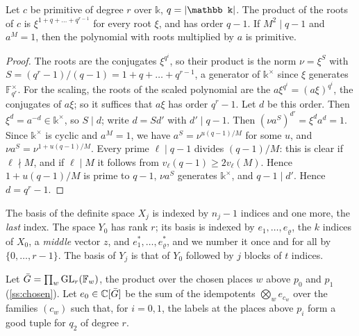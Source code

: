 \begin{lemma}\label{lem:primitive-label}
Let $c$ be primitive of degree $r$ over $\mathbb k$, $q=\abs{\mathbb k}$. The product of the roots of $c$ is
$\xi^{1+q+\dots+q^{r-1}}$ for every root $\xi$, and has order $q-1$. If $M^2\mid q-1$ and $a^M=1$, then the
polynomial with roots multiplied by $a$ is primitive.
\end{lemma}

\begin{proof}
The roots are the conjugates $\xi^{q^i}$, so their product is the norm $\nu=\xi^{S}$ with
$S=(q^r-1)/(q-1)=1+q+\dots+q^{r-1}$, a generator of $\mathbb k^\times$ since $\xi$ generates $\mathbb
F_{q^r}^\times$. For the scaling, the roots of the scaled polynomial are the $a\xi^{q^i}=(a\xi)^{q^i}$, the
conjugates of $a\xi$; so it suffices that $a\xi$ has order $q^r-1$. Let $d$ be this order. Then
$\xi^d=a^{-d}\in\mathbb k^\times$, so $S\mid d$; write $d=Sd'$ with $d'\mid q-1$. Then
$(\nu a^{S})^{d'}=\xi^{d}a^{d}=1$. Since $\mathbb k^\times$ is cyclic and $a^M=1$, we have
$a^S=\nu^{u(q-1)/M}$ for some $u$, and $\nu a^S=\nu^{1+u(q-1)/M}$. Every prime $\ell\mid q-1$ divides
$(q-1)/M$: this is clear if $\ell\nmid M$, and if $\ell\mid M$ it follows from $v_\ell(q-1)\ge2v_\ell(M)$.
Hence $1+u(q-1)/M$ is prime to $q-1$, $\nu a^S$ generates $\mathbb k^\times$, and $q-1\mid d'$. Hence
$d=q^r-1$.
\end{proof}

The basis of the definite space $X_j$ is indexed by $n_j-1$ indices and one more, the \emph{last} index.
The space $Y_0$ has rank $r$; its basis is indexed by $e_1,\dots,e_\varrho$, the $k$ indices of $X_0$, a
\emph{middle} vector $z$, and $e^*_1,\dots,e^*_\varrho$, and we number it once and for all by
$\{0,\dots,r-1\}$. The basis of $Y_j$ is that of $Y_0$ followed by $j$ blocks of $t$ indices.

Let $\bar G=\prod_w\operatorname{GL}_r(\mathbb{F}_w)$, the product over the chosen places $w$ above $p_0$ and $p_1$
(\cref{ss:chosen}). Let $e_0\in\mathbb{C}[\bar G]$ be the sum of the idempotents
$\bigotimes_we_{c_w}$ over the families $(c_w)$ such that, for $i=0,1$, the labels at the places above
$p_i$ form a good tuple for $q_2$ of degree $r$.

